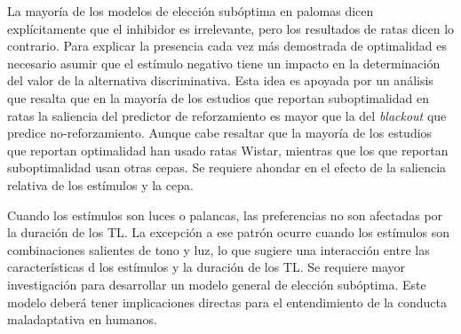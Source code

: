 \documentclass[a4paper,12pt]{article}
\begin{document}
La mayoría de los modelos de elección subóptima en palomas dicen  explícitamente que el inhibidor es irrelevante, pero los resultados de ratas dicen lo contrario. Para explicar la presencia cada vez más demostrada de optimalidad es necesario asumir que el estímulo negativo tiene un impacto en la determinación del valor de la alternativa discriminativa. Esta idea es apoyada por un análisis que resalta que en la mayoría de los estudios que reportan suboptimalidad en ratas la saliencia del predictor de reforzamiento es mayor que la del {\itshape blackout} que predice no-reforzamiento. Aunque cabe resaltar que la mayoría de los estudios que reportan optimalidad han usado ratas Wistar, mientras que los que reportan suboptimalidad usan otras cepas. Se requiere ahondar en el efecto de la saliencia relativa de los estímulos y la cepa.

Cuando los estímulos son luces o palancas, las preferencias no son afectadas por la duración de los TL. La excepción a ese patrón ocurre cuando los estímulos son combinaciones salientes de tono y luz, lo que sugiere una interacción entre las características d los estímulos y la duración de los TL. Se requiere mayor investigación para desarrollar un modelo general de elección subóptima. Este modelo deberá tener implicaciones directas para el entendimiento de la conducta maladaptativa en humanos.
\end{document}
